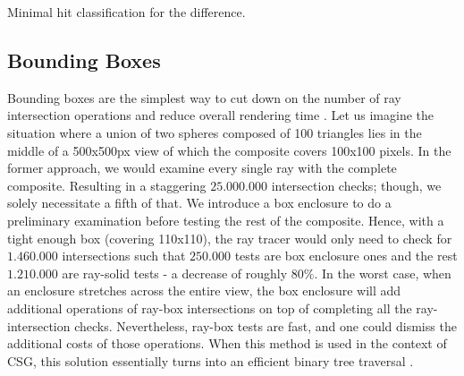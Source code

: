 \documentclass[a4paper,11pt,oneside]{article}
\begin{document}
\begin{algorithm}[H]
	\SetAlgoLined
	\caption{Minimal hit classification for the difference.}
	\label{sec3.4:difference_algo}
\end{algorithm} 


\subsection{Bounding Boxes}
\label{section:bounding-boxes-optimization}

Bounding boxes are the simplest way to cut down on the number of ray intersection operations and reduce overall rendering time \cite{efficient_csg_meshes}. Let us imagine the situation where a union of two spheres composed of 100 triangles lies in the middle of a 500x500px view of which the composite covers 100x100 pixels. In the former approach, we would examine every single ray with the complete composite. Resulting in a staggering $25.000.000$ intersection checks; though,  we solely necessitate a fifth of that. We introduce a box enclosure to do a preliminary examination before testing the rest of the composite. Hence, with a tight enough box (covering 110x110), the ray tracer would only need to check for $1.460.000$ intersections such that $250.000$ tests are box enclosure ones and the rest $1.210.000$ are ray-solid tests - a decrease of roughly $80\%$. In the worst case, when an enclosure stretches across the entire view, the box enclosure will add additional operations of ray-box intersections on top of completing all the ray-intersection checks. Nevertheless, ray-box tests are fast, and one could dismiss the additional costs of those operations. When this method is used in the context of CSG, this solution essentially turns into an efficient binary tree traversal \cite{ROTH1982109}. 
\end{document}
